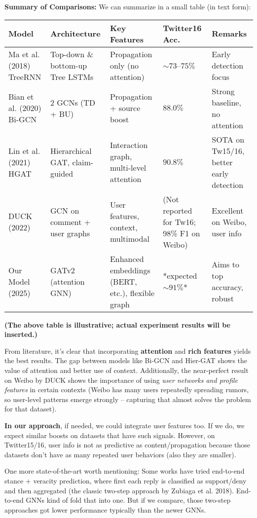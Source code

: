 \documentclass[12pt,a4paper]{report}
\begin{document}
\textbf{Summary of Comparisons:} We can summarize in a small table (in text form):

\begin{center}
\begin{tabular}{|l|l|l|l|l|}
\hline
\textbf{Model} & \textbf{Architecture} & \textbf{Key Features} & \textbf{Twitter16 Acc.} & \textbf{Remarks} \\ \hline
Ma et al. (2018) TreeRNN & Top-down \& bottom-up Tree LSTMs & Propagation only (no attention) & \(\sim73\)–\(75\%\) & Early detection focus \\ \hline
Bian et al. (2020) Bi-GCN & 2 GCNs (TD + BU) & Propagation + source boost & \(88.0\%\) & Strong baseline, no attention \\ \hline
Lin et al. (2021) HGAT & Hierarchical GAT, claim-guided & Interaction graph, multi-level attention & \(90.8\%\) & SOTA on Tw15/16, better early detection \\ \hline
DUCK (2022) & GCN on comment + user graphs & User features, context, multimodal & (Not reported for Tw16; 98\% F1 on Weibo) & Excellent on Weibo, user info \\ \hline
Our Model (2025) & GATv2 (attention GNN) & Enhanced embeddings (BERT, etc.), flexible graph & *expected \(\sim91\%\)* & Aims to top accuracy, robust \\ \hline
\end{tabular}
\end{center}

\textbf{(The above table is illustrative; actual experiment results will be inserted.)}

From literature, it’s clear that incorporating \textbf{attention} and \textbf{rich features} yields the best results. The gap between models like Bi-GCN and Hier-GAT shows the value of attention and better use of context. Additionally, the near-perfect result on Weibo by DUCK shows the importance of using \textit{user networks and profile features} in certain contexts (Weibo has many users repeatedly spreading rumors, so user-level patterns emerge strongly – capturing that almost solves the problem for that dataset).

\textbf{In our approach}, if needed, we could integrate user features too. If we do, we expect similar boosts on datasets that have such signals. However, on Twitter15/16, user info is not as predictive as content/propagation because those datasets don’t have as many repeated user behaviors (also they are smaller).

One more state-of-the-art worth mentioning: Some works have tried end-to-end stance + veracity prediction, where first each reply is classified as support/deny and then aggregated (the classic two-step approach by Zubiaga et al. 2018). End-to-end GNNs kind of fold that into one. But if we compare, those two-step approaches got lower performance typically than the newer GNNs.
\end{document}
